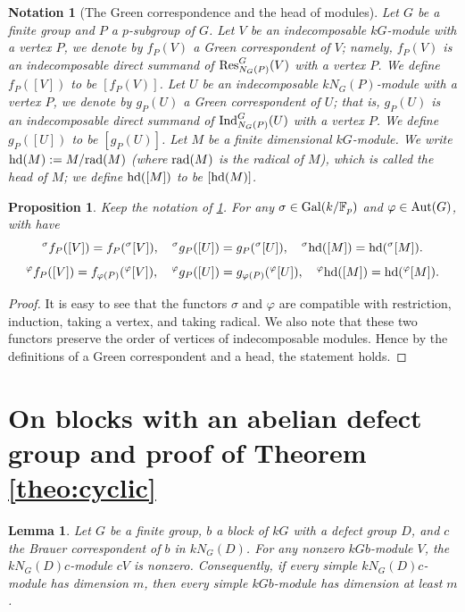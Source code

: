 \documentclass[preprint,12pt,3p]{elsarticle}
\newtheorem{lemma}[theorem]{Lemma}
\newtheorem{notation}[theorem]{Notation}
\newtheorem{proposition}[theorem]{Proposition}%
\def\Ind{{\rm Ind}}
\def\Res{{\rm Res}}
\def\Aut{{\rm Aut}}
\def\rad{{\rm rad}}
\def\Gal{{\rm Gal}}
\def\F{\mathbb{F}}
\def\hd{{\rm hd}}
\begin{document}
\begin{notation}[The Green correspondence and the head of modules]\label{notation: green corr and head}
	{\rm Let $G$ be a finite group and $P$ a $p$-subgroup of $G$. Let $V$ be an indecomposable $kG$-module with a vertex $P$, we denote by $f_P(V)$ a Green correspondent of $V$; namely, $f_P(V)$ is an indecomposable direct summand of $\Res_{N_G(P)}^G(V)$ with a vertex $P$. We define $f_P([V])$ to be $[f_P(V)]$. Let $U$ be an indecomposable $kN_G(P)$-module with a vertex $P$, we denote by $g_P(U)$ a Green correspondent of $U$; that is, $g_P(U)$ is an indecomposable direct summand of $\Ind_{N_G(P)}^G(U)$ with a vertex $P$. We define $g_P([U])$ to be $[g_P(U)]$. Let $M$ be a finite dimensional $kG$-module. We write $\hd(M):= M / \rad(M)$ (where $\rad(M)$ is the radical of $M$), which is called the {\it head} of $M$; we define $\hd([M])$ to be $[\hd(M)]$.
	}
\end{notation}

\begin{proposition}\label{prop: preserving green corr and head}
	Keep the notation of \ref{notation: green corr and head}. For any $\sigma\in \Gal(k/\F_p)$ and $\varphi\in \Aut(G)$, with have 
	$${}^\sigma f_P([V])=f_P({}^\sigma[V]),~~~{}^\sigma g_P([U])=g_{P}({}^\sigma[U]),~~~{}^\sigma \hd([M])=\hd({}^\sigma[M]).$$
	$${}^\varphi f_P([V])=f_{\varphi(P)}({}^\varphi[V]),~~~{}^\varphi g_P([U])=g_{\varphi(P)}({}^\varphi[U]),~~~{}^\varphi \hd([M])=\hd({}^\varphi[M]).$$
\end{proposition}

\begin{proof}
	It is easy to see that the functors $\sigma$ and $\varphi$ are compatible with restriction, induction, taking a vertex, and taking radical. We also note that these two functors preserve the order of vertices of indecomposable modules. Hence by the definitions of a Green correspondent and a head, the statement holds.
\end{proof}

\section{On blocks with an abelian defect group and proof of Theorem \ref{theo:cyclic}}\label{s3}



\begin{lemma}\label{lem:dimension at least}
Let $G$ be a finite group, $b$ a block of $kG$ with a defect group $D$, and $c$ the Brauer correspondent of $b$ in $kN_G(D)$. For any nonzero $kGb$-module $V$, the $k N_G(D)c$-module $cV$ is nonzero. Consequently, if every simple $kN_G(D)c$-module has dimension $m$, then every simple $kGb$-module has dimension at least $m$.
\end{lemma}
\end{document}
